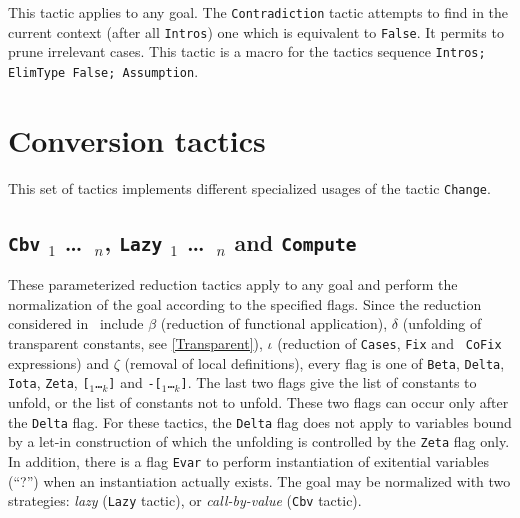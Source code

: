 This tactic applies to any goal. The {\tt Contradiction} tactic
attempts to find in the current context (after all {\tt Intros}) one
which is equivalent to {\tt False}. It permits to prune irrelevant
cases.  This tactic is a macro for the tactics sequence {\tt Intros;
  ElimType False; Assumption}.

\begin{ErrMsgs}
\item {}
\end{ErrMsgs}


\section{Conversion tactics}
\label{Conversion-tactics}

This set of tactics implements different specialized usages of the
tactic \texttt{Change}.


\subsection{{\tt Cbv} \flag$_1$ \dots\ \flag$_n$, {\tt Lazy} \flag$_1$
\dots\ \flag$_n$ {\rm and} {\tt Compute}}

These parameterized reduction tactics apply to any goal and perform
the normalization of the goal according to the specified flags. Since
the reduction considered in \Coq\ include $\beta$ (reduction of
functional application), $\delta$ (unfolding
of transparent constants, see \ref{Transparent}),
$\iota$ (reduction of {\tt Cases}, {\tt Fix} and {\tt
CoFix} expressions) and $\zeta$ (removal of local definitions), every flag is one of {\tt Beta}, {\tt Delta},
{\tt Iota}, {\tt Zeta}, {\tt [\qualid$_1$\ldots\qualid$_k$]} and 
{\tt -[\qualid$_1$\ldots\qualid$_k$]}.
The last two flags give the list of constants to unfold, or the list
of constants not to unfold. These two
flags can occur only after the {\tt Delta} flag. 
For these tactics, the {\tt Delta} flag does not apply to
variables bound by a let-in construction of which the unfolding is
controlled by the {\tt Zeta} flag only.
In addition, there is a flag {\tt Evar} to perform instantiation of exitential variables (``?'') when an instantiation actually exists.
The goal may be
normalized with two strategies: {\em lazy} ({\tt Lazy} tactic), or
{\em call-by-value} ({\tt Cbv} tactic).

